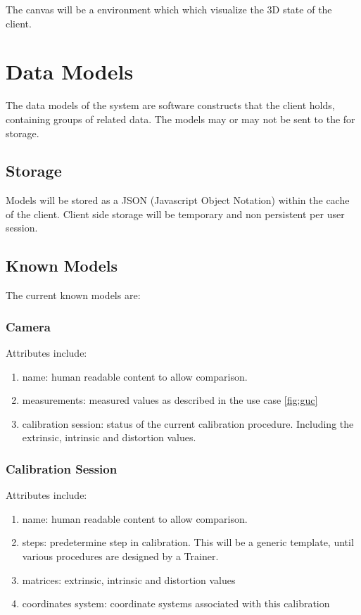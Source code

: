 \documentclass[11pt]{report}
\begin{document}
The canvas will be a  environment which which visualize the 3D state of the client. 

\section{Data Models}

The data models of the system are software constructs that the client holds, containing groups of related data. The models may or may not be sent to the  for storage. 

\subsection{Storage}

Models will be stored as a JSON (Javascript Object Notation) within the  cache of the client. Client side storage will be temporary and non persistent per user session.

\subsection{Known Models}

The current known models are:

\subsubsection{Camera}

Attributes include:

\begin{enumerate}
\item name: human readable content to allow comparison.
\item measurements: measured values as described in the use case \ref{fig:guc}
\item calibration session: status of the current calibration procedure. Including the extrinsic, intrinsic and distortion values.  
\end{enumerate}

\subsubsection{Calibration Session}

Attributes include:
\begin{enumerate}
\item name: human readable content to allow comparison.
\item steps: predetermine step in calibration. This will be a generic template, until various procedures are designed by a Trainer.
\item matrices: extrinsic, intrinsic and distortion values 
\item coordinates system: coordinate systems associated with this calibration 
\end{enumerate}
\end{document}
